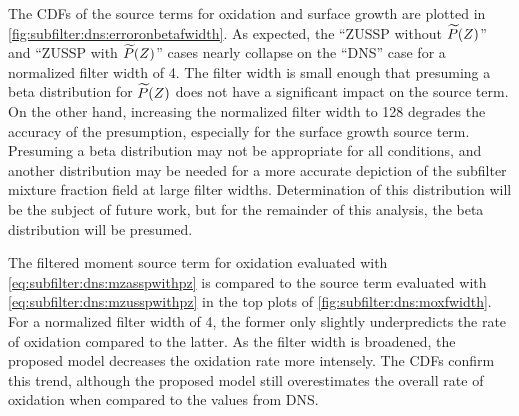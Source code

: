 The CDFs of the source terms for oxidation and surface growth are plotted in \cref{fig:subfilter:dns:erroronbetafwidth}. As expected, the ``ZUSSP without $\widetilde{P}(Z)$'' and ``ZUSSP with $\widetilde{P}(Z)$'' cases nearly collapse on the ``DNS'' case for a normalized filter width of 4. The filter width is small enough that presuming a beta distribution for $\widetilde{P}(Z)$ does not have a significant impact on the source term. On the other hand, increasing the normalized filter width to 128 degrades the accuracy of the presumption, especially for the surface growth source term. Presuming a beta distribution may not be appropriate for all conditions, and another distribution may be needed for a more accurate depiction of the subfilter mixture fraction field at large filter widths. Determination of this distribution will be the subject of future work, but for the remainder of this analysis, the beta distribution will be presumed.

The filtered moment source term for oxidation evaluated with \cref{eq:subfilter:dns:mzasspwithpz} is compared to the source term evaluated with \cref{eq:subfilter:dns:mzusspwithpz} in the top plots of \cref{fig:subfilter:dns:moxfwidth}. For a normalized filter width of 4, the former only slightly underpredicts the rate of oxidation compared to the latter. As the filter width is broadened, the proposed model decreases the oxidation rate more intensely. The CDFs confirm this trend, although the proposed model still overestimates the overall rate of oxidation when compared to the values from DNS.

